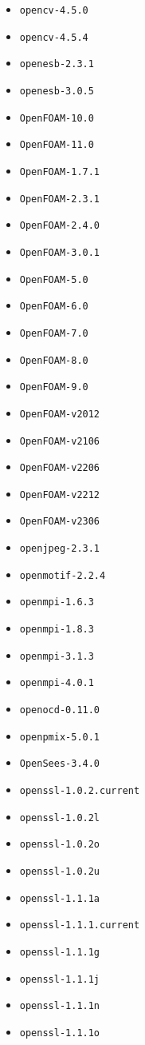 \begin{multicols}{3}
\begin{itemize}
\item \verb|opencv-4.5.0|
\item \verb|opencv-4.5.4|
\item \verb|openesb-2.3.1|
\item \verb|openesb-3.0.5|
\item \verb|OpenFOAM-10.0|
\item \verb|OpenFOAM-11.0|
\item \verb|OpenFOAM-1.7.1|
\item \verb|OpenFOAM-2.3.1|
\item \verb|OpenFOAM-2.4.0|
\item \verb|OpenFOAM-3.0.1|
\item \verb|OpenFOAM-5.0|
\item \verb|OpenFOAM-6.0|
\item \verb|OpenFOAM-7.0|
\item \verb|OpenFOAM-8.0|
\item \verb|OpenFOAM-9.0|
\item \verb|OpenFOAM-v2012|
\item \verb|OpenFOAM-v2106|
\item \verb|OpenFOAM-v2206|
\item \verb|OpenFOAM-v2212|
\item \verb|OpenFOAM-v2306|
\item \verb|openjpeg-2.3.1|
\item \verb|openmotif-2.2.4|
\item \verb|openmpi-1.6.3|
\item \verb|openmpi-1.8.3|
\item \verb|openmpi-3.1.3|
\item \verb|openmpi-4.0.1|
\item \verb|openocd-0.11.0|
\item \verb|openpmix-5.0.1|
\item \verb|OpenSees-3.4.0|
\item \verb|openssl-1.0.2.current|
\item \verb|openssl-1.0.2l|
\item \verb|openssl-1.0.2o|
\item \verb|openssl-1.0.2u|
\item \verb|openssl-1.1.1a|
\item \verb|openssl-1.1.1.current|
\item \verb|openssl-1.1.1g|
\item \verb|openssl-1.1.1j|
\item \verb|openssl-1.1.1n|
\item \verb|openssl-1.1.1o|

\end{itemize}
\end{multicols}
